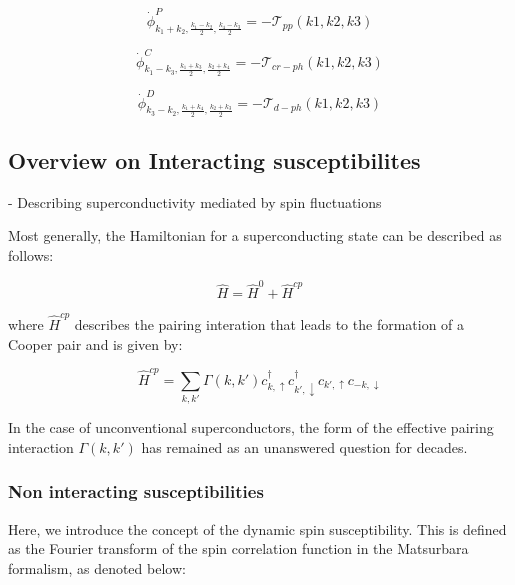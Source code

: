 \documentclass[12pt]{article}
\begin{document}
\begin{equation}
    \dot{\phi}^{P}_{k_1 +k_2, \frac{k_1 - k_2}{2}, \frac{k_4-k_3}{2}} = - \mathcal{T}_{pp}(k1,k2,k3)
\end{equation}


\begin{equation}
    \dot{\phi}^{C}_{k_1 - k_3, \frac{k_1 +k_3}{2}, \frac{k_2+k_4}{2}} = - \mathcal{T}_{cr-ph}(k1,k2,k3)
\end{equation}

\begin{equation}
    \dot{\phi}^{D}_{k_3- k_2, \frac{k_1 + k_4}{2}, \frac{k_2+k_3}{2}} = - \mathcal{T}_{d-ph}(k1,k2,k3)
\end{equation}


\subsection{Overview on Interacting susceptibilites}

- Describing superconductivity mediated by spin fluctuations

Most generally, the Hamiltonian for a superconducting state can be described as follows:

\begin{equation}\label{General Hamiltonian}
    \hat{H} = \hat{H}^0 + \hat{H}^{cp}
\end{equation}

where $\hat{H}^{cp}$ describes the pairing interation that leads to the formation of a Cooper pair and is given by:

\begin{equation}\label{Hcp}
    \hat{H}^{cp} = \sum_{k,k'} \Gamma(k, k') c^{\dagger}_{k, \uparrow}  c^{\dagger}_{k', \downarrow} c_{k', \uparrow}c_{-k, \downarrow}
\end{equation}

In the case of unconventional superconductors, the form of the effective pairing interaction $\Gamma(k,k')$ has remained as an unanswered question for decades. 

\subsubsection{Non interacting susceptibilities}

Here, we introduce the concept of the dynamic spin susceptibility. This is defined as the Fourier transform of the spin correlation function in the Matsurbara formalism, as denoted below:
\end{document}
